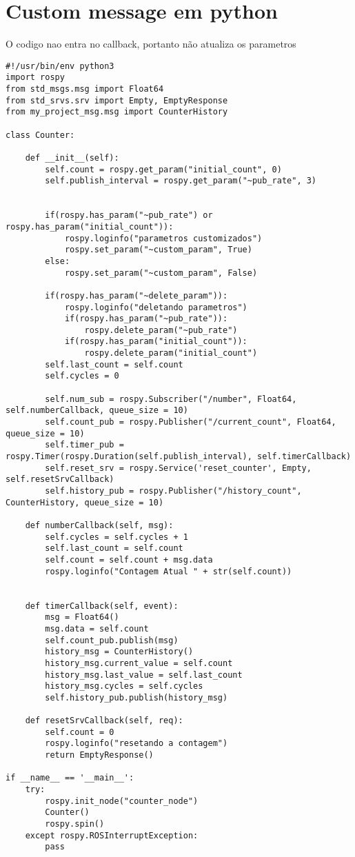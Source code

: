 \documentclass[letterpaper]{article}
\begin{document}
\section{Custom message em python}
O codigo nao entra no callback, portanto não atualiza os parametros
\begin{lstlisting}[style=pythonstyle, title=src/my\_project\_py/scripts/counter.py] 
#!/usr/bin/env python3
import rospy
from std_msgs.msg import Float64
from std_srvs.srv import Empty, EmptyResponse
from my_project_msg.msg import CounterHistory

class Counter:

    def __init__(self):
        self.count = rospy.get_param("initial_count", 0)
        self.publish_interval = rospy.get_param("~pub_rate", 3)
        
        
        if(rospy.has_param("~pub_rate") or rospy.has_param("initial_count")):
            rospy.loginfo("parametros customizados")
            rospy.set_param("~custom_param", True)
        else:
            rospy.set_param("~custom_param", False)
            
        if(rospy.has_param("~delete_param")):
            rospy.loginfo("deletando parametros")   
            if(rospy.has_param("~pub_rate")):
                rospy.delete_param("~pub_rate") 
            if(rospy.has_param("initial_count")):
                rospy.delete_param("initial_count")     
        self.last_count = self.count
        self.cycles = 0    
       
        self.num_sub = rospy.Subscriber("/number", Float64, self.numberCallback, queue_size = 10)
        self.count_pub = rospy.Publisher("/current_count", Float64, queue_size = 10)
        self.timer_pub = rospy.Timer(rospy.Duration(self.publish_interval), self.timerCallback)
        self.reset_srv = rospy.Service('reset_counter', Empty, self.resetSrvCallback)
        self.history_pub = rospy.Publisher("/history_count", CounterHistory, queue_size = 10)
        
    def numberCallback(self, msg):
        self.cycles = self.cycles + 1
        self.last_count = self.count
        self.count = self.count + msg.data
        rospy.loginfo("Contagem Atual " + str(self.count))


    def timerCallback(self, event):
        msg = Float64()
        msg.data = self.count
        self.count_pub.publish(msg)
        history_msg = CounterHistory()
        history_msg.current_value = self.count
        history_msg.last_value = self.last_count
        history_msg.cycles = self.cycles
        self.history_pub.publish(history_msg)
        
    def resetSrvCallback(self, req):
        self.count = 0 
        rospy.loginfo("resetando a contagem")
        return EmptyResponse()

if __name__ == '__main__':
    try:
        rospy.init_node("counter_node")
        Counter()
        rospy.spin()
    except rospy.ROSInterruptException:
        pass
\end{lstlisting}
\end{document}
